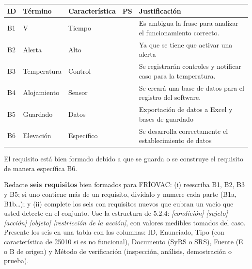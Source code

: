 \documentclass[11pt]{article}
\begin{document}
\begin{cajarespuesta}[title={Respuestas del estudiante: T2}]
		\begin{longtable}{|p{0.8cm}|p{2.2cm}|p{2.2cm}|p{2.2cm}|p{6.3cm}|}
			\hline
			ID & Término & Característica & PS & Justificación\\ \hline
			B1 & V & Tiempo & & Es ambigua la frase para analizar el funcionamiento correcto.\\ \hline
			B2 & Alerta & Alto & & Ya que se tiene que activar una alerta\\ \hline
			B3 & Temperatura & Control & & Se registrarán controles y notificar caso para la temperatura.\\ \hline
			B4 & Alojamiento & Sensor & & Se creará una base de datos para el registro del software.\\ \hline
			B5 & Guardado & Datos & & Exportación de datos a Excel y bases de guardado\\ \hline
			B6 & Elevación & Específico & & Se desarrolla correctamente el establecimiento de datos\\ \hline
		\end{longtable}
		
		El requisito está bien formado debido a que se guarda o se construye el requisito de manera específica B6.
	\end{cajarespuesta}
	
	\begin{cajatarea}[title={T3. Redacción de requisitos bien formados \hfill D3 · 30\,\%}]
		Redacte \textbf{seis requisitos} bien formados para FRÍOVAC: (i) reescriba B1, B2, B3 y B5; si uno contiene más de un requisito, divídalo y numere cada parte (B1a, B1b\ldots); y (ii) complete los seis con requisitos nuevos que cubran un vacío que usted detecte en el conjunto. Use la estructura de 5.2.4: \emph{[condición] [sujeto] [acción] [objeto] [restricción de la acción]}, con valores medibles tomados del caso.\\[4pt]
		Presente los seis en una tabla con las columnas: ID, Enunciado, Tipo (con característica de 25010 si es no funcional), Documento (SyRS o SRS), Fuente (E o B de origen) y Método de verificación (inspección, análisis, demostración o prueba).
	\end{cajatarea}
	
\end{document}
